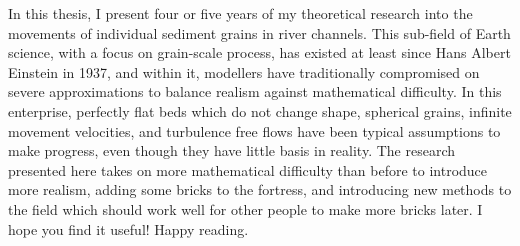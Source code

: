 In this thesis, I present four or five years of my theoretical research into the movements of individual sediment grains in river channels.
This sub-field of Earth science, with a focus on grain-scale process, has existed at least since Hans Albert Einstein in 1937, and within it, modellers have traditionally compromised on severe approximations to balance realism against mathematical difficulty.
In this enterprise, perfectly flat beds which do not change shape, spherical grains, infinite movement velocities, and turbulence free flows have been typical assumptions to make progress, even though they have little basis in reality.
The research presented here takes on more mathematical difficulty than before to introduce more realism, adding some bricks to the fortress, and introducing new methods to the field which should work well for other people to make more bricks later. I hope you find it useful! Happy reading.
